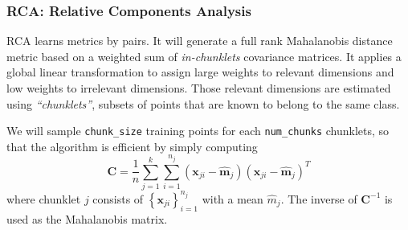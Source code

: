 \subsubsection{RCA: Relative Components Analysis}

RCA\cite{RCA1,RCA2,RCA3} learns metrics by pairs. It will generate a full rank Mahalanobis distance metric based on a weighted sum of \emph{in-chunklets} covariance matrices. It applies a global linear transformation to assign large weights to relevant
dimensions and low weights to irrelevant dimensions. Those relevant dimensions are estimated using \emph{``chunklets''}, subsets of points that are known to belong to the same class.

We will sample \texttt{chunk\_size} training points for each \texttt{num\_chunks} chunklets, so that the algorithm is efficient by simply computing
$$
\mathbf{C}=\frac{1}{n} \sum_{j=1}^{k} \sum_{i=1}^{n_{j}}\left(\mathbf{x}_{j i}-\hat{\mathbf{m}}_{j}\right)\left(\mathbf{x}_{j i}-\hat{\mathbf{m}}_{j}\right)^{T}
$$
where chunklet $j$ consists of $\left\{\mathbf{x}_{j i}\right\}_{i=1}^{n_{j}}$ with a mean $\hat{m}_{j} .$ The inverse of $\mathbf{C}^{-1}$ is used as the Mahalanobis matrix.

